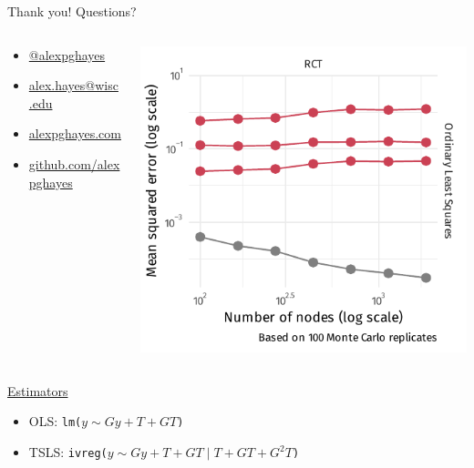 \documentclass[aspectratio=169]{beamer}
\theoremstyle{remark}
\begin{document}
\begin{frame}{Thank you! Questions?}
    \begin{columns}
        \begin{column}{0.4\textwidth}
            \begin{itemize}
                \item[]  \href{https://twitter.com/alexpghayes}{@alexpghayes}
                \item[]  \href{mailto:alex.hayes@wisc.edu}{alex.hayes@wisc.edu}
                \item[]  \href{https://www.alexpghayes.com}{alexpghayes.com}
                \item[]  \href{https://github.com/alexpghayes}{github.com/alexpghayes}
            \end{itemize}
        \end{column}
        \begin{column}{0.6\textwidth}
            \centering
            \includegraphics{./figures/simulations/defense-last-slide.pdf}
        \end{column}
    \end{columns}
\end{frame}

\appendix

\begin{frame}
    \underline{Estimators}
    \begin{itemize}
        \setlength\itemsep{1.25em}
        \item OLS: \texttt{lm($y \sim Gy + T + GT$)}
        \item TSLS: \texttt{ivreg($y \sim Gy + T + GT \mid T + GT + G^2T$)}
    \end{itemize}
\end{frame}
\end{document}
